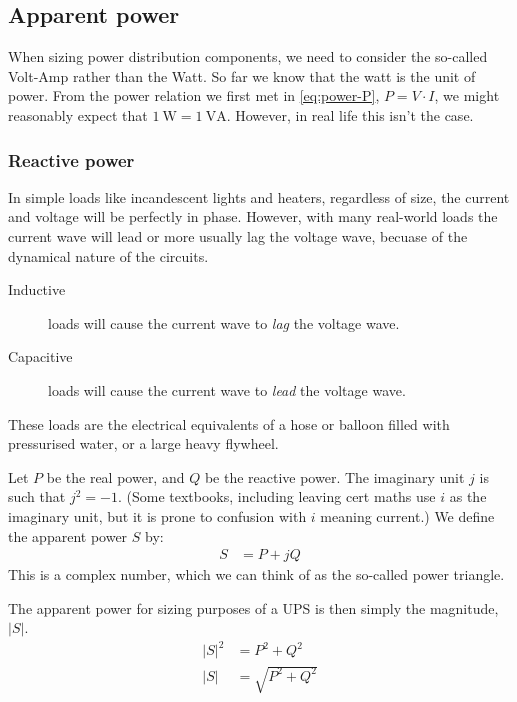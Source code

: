 \documentclass{pgnotes}
\begin{document}
\subsection{Apparent power}

When sizing power distribution components, we need to consider the so-called Volt-Amp rather than the Watt.
So far we know that the watt is the unit of power.
From the power relation we first met in \autoref{eq:power-P}, $P = V \cdot I$, we might reasonably expect that $\SI{1}{\watt}=\SI{1}{\volt\ampere}$.
However, in real life this isn't the case.

\subsubsection{Reactive power}

In simple loads like incandescent lights and heaters, regardless of size, the current and voltage will be perfectly in phase.
However, with many real-world loads the current wave will lead or more usually lag the voltage wave, becuase of the dynamical nature of the circuits.
\begin{description}
\item[Inductive] loads will cause the current wave to \textit{lag} the voltage wave.
\item[Capacitive] loads will cause the current wave to \textit{lead} the voltage wave.
\end{description}
These loads are the electrical equivalents of a hose or balloon filled with pressurised water, or a large heavy flywheel.


Let $P$ be the real power, and $Q$ be the reactive power.
The imaginary unit $j$ is such that $j^2=-1$.
(Some textbooks, including leaving cert maths use $i$ as the imaginary unit, but it is prone to confusion with $i$ meaning current.)
We define the apparent power $S$ by:
\begin{align}
  S & = P + j Q
\end{align}
This is a complex number, which we can think of as the so-called power triangle.

The apparent power for sizing purposes of a UPS is then simply the magnitude, $ \left \lvert S \right \rvert $.
\begin{align}
  \left \lvert S \right \rvert ^2 & = P^2 + Q^2 \\
  \left \lvert S \right \rvert & = \sqrt{P^2+Q^2}   
\end{align}
\end{document}
